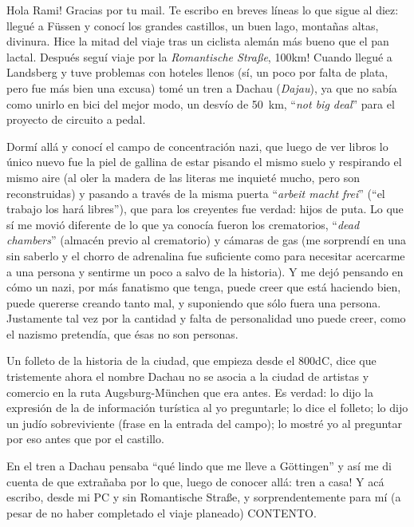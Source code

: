 \textexclamdown Hola Rami! Gracias por tu mail. Te escribo en breves l\'ineas
lo que sigue al diez: llegu\'e a F\"ussen y conoc\'i los grandes castillos, un
buen lago, monta\~nas altas, divinura. Hice la mitad del viaje tras un
ciclista alem\'an m\'as bueno que el pan lactal. Despu\'es segu\'i viaje por
la \emph{Romantische Stra\ss e}, \textexclamdown 100km! Cuando llegu\'e a
Landsberg y tuve problemas con hoteles llenos (s\'i, un poco por falta de
plata, pero fue m\'as bien una excusa) tom\'e un tren a Dachau
(\emph{Dajau}), ya que no sab\'ia como unirlo en bici del mejor modo, un
desv\'io de 50~km, ``\emph{not big deal}'' para el proyecto de circuito a
pedal.

Dorm\'i all\'a y conoc\'i el campo de concentraci\'on nazi, que luego de ver
libros lo \'unico nuevo fue la piel de gallina de estar pisando el mismo suelo
y respirando el mismo aire (al oler la madera de las literas me inquiet\'e
mucho, pero son reconstruidas) y pasando a trav\'es de la misma puerta
``\emph{arbeit macht frei}'' (``el trabajo los har\'a libres''), que para los
creyentes fue verdad: hijos de puta. Lo que s\'i me movi\'o diferente de lo
que ya conoc\'ia fueron los crematorios, ``\emph{dead chambers}'' (almac\'en
previo al crematorio) y c\'amaras de gas (me sorprend\'i en una sin saberlo y
el chorro de adrenalina fue suficiente como para necesitar acercarme a una
persona y sentirme un poco a salvo de la historia). Y me dej\'o pensando en
c\'omo un nazi, por m\'as fanatismo que tenga, puede creer que est\'a haciendo
bien, puede quererse creando tanto mal, y suponiendo que s\'olo fuera una
persona. Justamente tal vez por la cantidad y falta de personalidad uno puede
creer, como el nazismo pretend\'ia, que \'esas no son personas.

Un folleto de la historia de la ciudad, que empieza desde el 800dC, dice que
tristemente ahora el nombre Dachau no se asocia a la ciudad de artistas y
comercio en la ruta Augsburg-M\"unchen que era antes. Es verdad: lo dijo la
expresi\'on de la de informaci\'on tur\'istica al yo preguntarle; lo dice el
folleto; lo dijo un jud\'io sobreviviente (frase en la entrada del campo); lo
mostr\'e yo al preguntar por eso antes que por el castillo.

En el tren a Dachau pensaba ``qu\'e lindo que me lleve a G\"ottingen'' y as\'i
me di cuenta de que extra\~naba por lo que, luego de conocer all\'a:
\textexclamdown tren a casa! Y ac\'a escribo, desde mi {\small PC} y sin
Romantische Stra\ss e, y sorprendentemente para m\'i (a pesar de no haber
completado el viaje planeado) {\small CONTENTO}.

